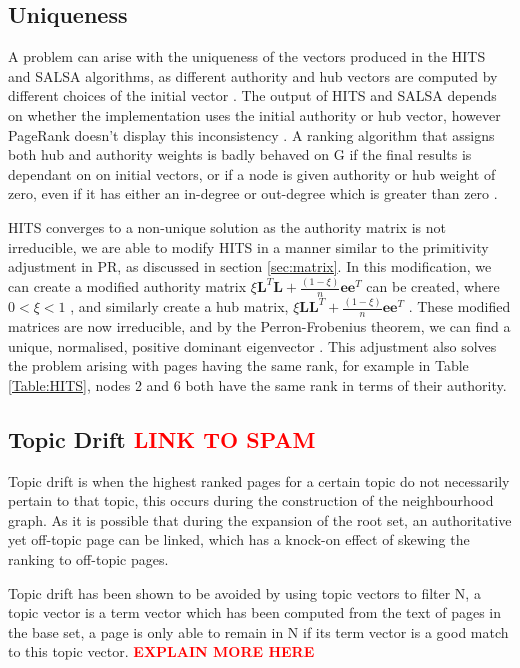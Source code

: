 \documentclass[11pt]{report}
\begin{document}
{\subsection{Uniqueness}
A problem can arise with the uniqueness of the vectors produced in the HITS and SALSA algorithms, as different authority and hub vectors are computed by different choices of the initial vector \cite{langville}. The output of HITS and SALSA depends on whether the implementation uses the initial authority or hub vector, however PageRank doesn't display this inconsistency \cite{farahat2006authority}. A ranking algorithm that assigns both hub and authority weights is badly behaved on G if the final results is dependant on on initial vectors, or if a node is given authority or hub weight of zero, even if it has either an in-degree or out-degree which is greater than zero \cite{bonato}.

HITS converges to a non-unique solution as the authority matrix is not irreducible, we are able to modify HITS in a manner similar to the primitivity adjustment in PR, as discussed in section \ref{sec:matrix}. In this modification, we can create a modified authority matrix \(\xi\textbf{L}^T\textbf{L} +\frac{(1-\xi)}{n}\textbf{ee}^T\) can be created, where $0<\xi<1$ \cite{ng2001stable}, and similarly create a hub matrix, \(\xi\textbf{LL}^T +\frac{(1-\xi)}{n}\textbf{ee}^T\) . These modified matrices are now irreducible, and by the Perron-Frobenius theorem, we can find a unique, normalised, positive dominant eigenvector \cite{meyer2000matrix}. This adjustment also solves the problem arising with pages having the same rank, for example in Table \ref{Table:HITS}, nodes 2 and 6 both have the same rank in terms of their authority.

\subsection{Topic Drift \textcolor{red}{LINK TO SPAM}}

Topic drift is when the highest ranked pages for a certain topic do not necessarily pertain to that topic, this occurs during the construction of the neighbourhood graph. As it is possible that during the expansion of the root set, an authoritative yet off-topic page can be linked, which has a knock-on effect of skewing the ranking to off-topic pages. 

Topic drift has been shown to be avoided by using topic vectors to filter N, a topic vector is a term vector which has been computed from the text of pages in the base set, a page is only able to remain in N if its term vector is a good match to this topic vector. \textcolor{red}{\textbf{EXPLAIN MORE HERE}}

}
\end{document}
